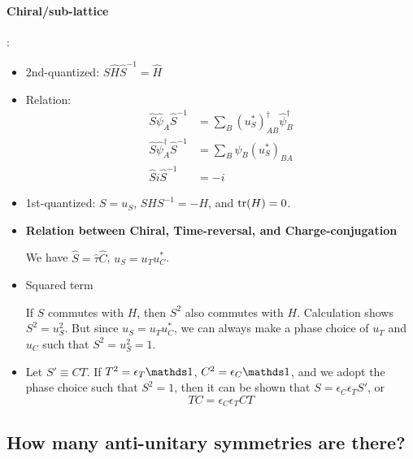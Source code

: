 \documentclass{article}
\begin{document}
\paragraph{Chiral/sub-lattice}:
\begin{itemize}
    \item 2nd-quantized: 
        $\hat{S}\hat{H}\hat{S}^{-1}=\hat{H}$ 
    \item Relation:
    \begin{align}
        \hat{S} \hat\psi_A \hat{S}^{-1} &=
        \sum_B (u_S^*)^\dagger_{AB} \hat\psi^\dagger_B \\
        \hat{S} \hat\psi^\dagger_A \hat{S}^{-1} &= 
        \sum_B  \hat\psi_B (u_S^*)_{BA} \\
        \hat{S}i\hat{S}^{-1} &= -i
    \end{align}
    \item 1st-quantized:
        $S=u_S$, $SHS^{-1}=-H$, and $\tr(H)=0$.
    \item \textbf{Relation between Chiral, Time-reversal, and
        Charge-conjugation}

        We have $\hat{S}=\hat{\tau}\hat{C}$, $u_S = u_T u_C^*$. 

    \item Squared term
        
        If $S$ commutes with $H$, then $S^2$ also
        commutes with $H$. Calculation shows $S^2= u^2_S$. But since
        $u_S=u_Tu_C^*$, we can always make a phase choice of $u_T$ and
        $u_C$ such that $S^2=u^2_S = 1$.

    \item Let $S'\equiv CT$. If $T^2=\epsilon_T\id$,
        $C^2=\epsilon_C\id$, and we adopt the phase choice such that
        $S^2=1$, then it can be shown that $S=\epsilon_C\epsilon_T
        S'$, or
        \begin{equation}
            TC = \epsilon_C\epsilon_T CT
        \end{equation}
\end{itemize}



\subsection{How many anti-unitary symmetries are there?}
\label{sec:How many anti-unitary symmetries are there?}
\end{document}
